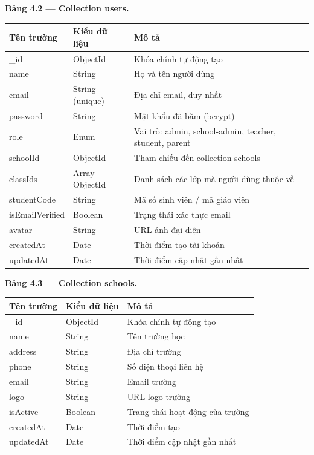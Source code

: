 ﻿\documentclass[../DoAn.tex]{subfiles}
\begin{document}
\noindent\textbf{Bảng 4.2 — Collection users.}
\begin{center}
\begin{tabular}{|p{3.5cm}|p{2.5cm}|p{7cm}|}
\hline
\textbf{Tên trường} & \textbf{Kiểu dữ liệu} & \textbf{Mô tả} \\ \hline
\_id & ObjectId & Khóa chính tự động tạo \\ \hline
name & String & Họ và tên người dùng \\ \hline
email & String (unique) & Địa chỉ email, duy nhất \\ \hline
password & String & Mật khẩu đã băm (bcrypt) \\ \hline
role & Enum & Vai trò: admin, school-admin, teacher, student, parent \\ \hline
schoolId & ObjectId & Tham chiếu đến collection schools \\ \hline
classIds & Array ObjectId & Danh sách các lớp mà người dùng thuộc về \\ \hline
studentCode & String & Mã số sinh viên / mã giáo viên \\ \hline
isEmailVerified & Boolean & Trạng thái xác thực email \\ \hline
avatar & String & URL ảnh đại diện \\ \hline
createdAt & Date & Thời điểm tạo tài khoản \\ \hline
updatedAt & Date & Thời điểm cập nhật gần nhất \\ \hline
\end{tabular}
\end{center}

\vspace{0.3cm}

\noindent\textbf{Bảng 4.3 — Collection schools.}
\begin{center}
\begin{tabular}{|p{3.5cm}|p{2.5cm}|p{7cm}|}
\hline
\textbf{Tên trường} & \textbf{Kiểu dữ liệu} & \textbf{Mô tả} \\ \hline
\_id & ObjectId & Khóa chính tự động tạo \\ \hline
name & String & Tên trường học \\ \hline
address & String & Địa chỉ trường \\ \hline
phone & String & Số điện thoại liên hệ \\ \hline
email & String & Email trường \\ \hline
logo & String & URL logo trường \\ \hline
isActive & Boolean & Trạng thái hoạt động của trường \\ \hline
createdAt & Date & Thời điểm tạo \\ \hline
updatedAt & Date & Thời điểm cập nhật gần nhất \\ \hline
\end{tabular}
\end{center}
\end{document}
